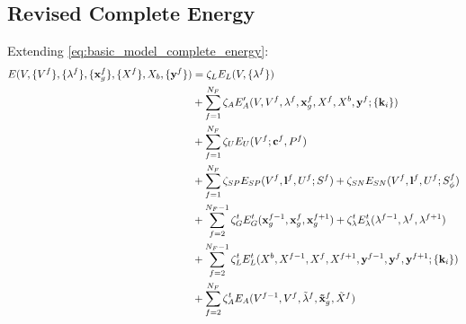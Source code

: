 \documentclass[a4paper,10pt]{article}
\newcommand{\mb}{\mathbf}
\begin{document}
\subsection{Revised Complete Energy}
Extending \eqref{eq:basic_model_complete_energy}:
\begin{align}
\label{eq:revised_model_complete_energy}
E(V, \{V^f\}, \{\lambda^f\}, \{\mb{x}^f_g\}, \{X^f\}, X_b, \{\mb{y}^f\}) &= \zeta_{L} E_{L}(V, \{\lambda^f\}) \notag\\
&+ \sum_{f=1}^{N_F} \zeta_{A} E'_{A}(V, V^f, \lambda^f, \mb{x}^f_g, X^f, X^b, \mb{y}^f ; \{\mb{k}_i\}) \notag\\
&+ \sum_{f=1}^{N_F} \zeta_{U} E_{U}(V^f ; \mb{c}^f, P^f) \notag \\
&+ \sum_{f=1}^{N_F} \zeta_{SP} E_{SP}(V^f, \mb{l}^f, U^f ; S^f)  + \zeta_{SN} E_{SN}(V^f, \mb{l}^f, U^f ; S_\phi^f) \notag \\
&+ \sum_{f=2}^{N_F - 1} \zeta^t_G E^t_G(\mb{x}_g^{f-1}, \mb{x}_g^{f}, \mb{x}_g^{f+1}) + \zeta^t_\lambda E^t_\lambda(\lambda^{f-1}, \lambda^{f}, \lambda^{f+1}) \notag \\
&+ \sum_{f=2}^{N_F - 1} \zeta^t_L E^t_L(X^b, X^{f-1}, X^{f}, X^{f+1}, \mb{y}^{f-1}, \mb{y}^f, \mb{y}^{f+1} ; \{\mb{k}_i\}) \notag \\
&+ \sum_{f=2}^{N_F} \zeta^t_A E_{A}(V^{f-1}, V^f, {\tilde\lambda}^f, \mb{\tilde x}^f_g, {\tilde X}^f)
\end{align}

% 
\end{document}
